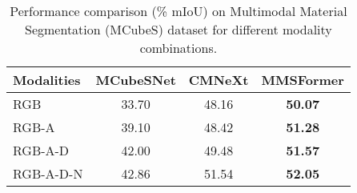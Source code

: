 \documentclass{article}
\begin{document}
\begin{table}[th]
\centering
\caption{Performance comparison (\% mIoU) on Multimodal Material Segmentation (MCubeS) \cite{Liang2022MCubeS} dataset for different modality combinations.}
\setlength{\tabcolsep}{2pt}
\begin{tabular}{lccc}
    \toprule
    Modalities & MCubeSNet \cite{Liang2022MCubeS} & CMNeXt \cite{zhang2023CMNext} & MMSFormer         \\
    \midrule
    \midrule
    RGB        & 33.70     & 48.16  & \textbf{50.07} \\
    RGB-A      & 39.10     & 48.42  & \textbf{51.28} \\
    RGB-A-D    & 42.00     & 49.48  & \textbf{51.57} \\
    RGB-A-D-N  & 42.86     & 51.54  & \textbf{52.05} \\
    \bottomrule
\end{tabular}
\label{tab:modality-wise-comparison}
\end{table} 
\end{document}
